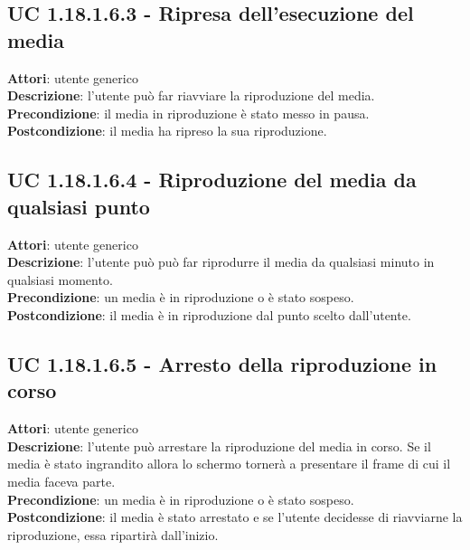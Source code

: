 	\subsection{UC 1.18.1.6.3 - Ripresa dell'esecuzione del media}{
		\label{uc1.18.1.6.3}
		\textbf{Attori}: utente generico \\
		\textbf{Descrizione}: l'utente può far riavviare la riproduzione del media. \\
		\textbf{Precondizione}: il media in riproduzione è stato messo in pausa.	\\
		\textbf{Postcondizione}: il media ha ripreso la sua riproduzione.	\\
	}
	\subsection{UC 1.18.1.6.4 - Riproduzione del media da qualsiasi punto}{
		\label{uc1.18.1.6.4}
		\textbf{Attori}: utente generico \\
		\textbf{Descrizione}: l'utente può può far riprodurre il media da qualsiasi minuto in qualsiasi momento. \\
		\textbf{Precondizione}: un media è in riproduzione o è stato sospeso.	\\
		\textbf{Postcondizione}: il media è in riproduzione dal punto scelto dall'utente.	\\
	}
	\subsection{UC 1.18.1.6.5 - Arresto della riproduzione in corso}{
		\label{uc1.18.1.6.5}
		\textbf{Attori}: utente generico \\
		\textbf{Descrizione}: l'utente può arrestare la riproduzione del media in corso. Se il media è stato ingrandito allora lo schermo tornerà a presentare il frame di cui il media faceva parte. \\
		\textbf{Precondizione}: un media è in riproduzione o è stato sospeso.	\\
		\textbf{Postcondizione}: il media è stato arrestato e se l'utente decidesse di riavviarne la riproduzione, essa ripartirà dall'inizio.	\\
	}
